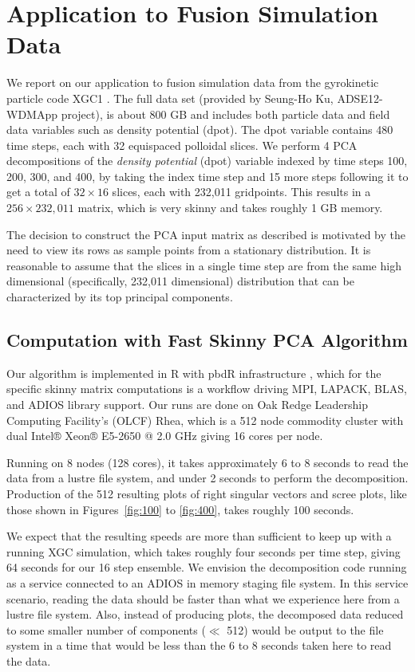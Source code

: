\section{Application to Fusion Simulation Data}
\label{sec:xgc}
We report on our application to fusion simulation data from the
gyrokinetic particle code XGC1 \cite{Ku2009}. The full data set
(provided by Seung-Ho Ku, ADSE12-WDMApp project), is about 800 GB and
includes both particle data and field data variables such as density
potential (dpot). The dpot variable contains 480 time steps, each with
32 equispaced polloidal slices. We perform 4 PCA decompositions of the
{\it density potential} (dpot) variable indexed by time steps 100,
200, 300, and 400, by taking the index time step and 15 more steps
following it to get a total of $32\times 16$ slices, each with 232,011
gridpoints. This results in a $256\times 232,011$ matrix, which is
very skinny and takes roughly 1 GB memory.

The decision to construct the PCA input matrix as described is
motivated by the need to view its rows as sample points from a
stationary distribution. It is reasonable to assume that the slices in
a single time step are from the same high dimensional (specifically,
232,011 dimensional) distribution that can be characterized by its top
principal components.

\subsection{Computation with Fast Skinny PCA Algorithm}
Our algorithm is implemented in R with pbdR infrastructure
\cite{Schmidt2017}, which for the specific skinny matrix computations
is a workflow driving MPI, LAPACK, BLAS, and ADIOS library
support. Our runs are done on Oak Redge Leadership Computing
Facility's (OLCF) Rhea, which is a 512 node commodity cluster with
dual Intel® Xeon® E5-2650 @ 2.0 GHz giving 16 cores per node.

Running on 8 nodes (128 cores), it takes
approximately 6 to 8 seconds to read the data from a lustre file
system, and under 2 seconds to perform the decomposition. Production
of the 512 resulting plots of right singular vectors and scree plots, like
those shown in Figures~\ref{fig:100} to \ref{fig:400}, takes roughly
100 seconds.

We expect that the resulting speeds are more than sufficient to keep
up with a running XGC simulation, which takes roughly four seconds per
time step, giving 64 seconds for our 16 step
ensemble. We envision the decomposition code running as a service
connected to an ADIOS in memory staging file system. In this service
scenario, reading the data should be faster than what we experience
here from a lustre file system. Also, instead of producing plots, the
decomposed data reduced to some smaller number of components ($\ll$
512) would be output to the file system in a time that would be less
than the 6 to 8 seconds taken here to read the data.


